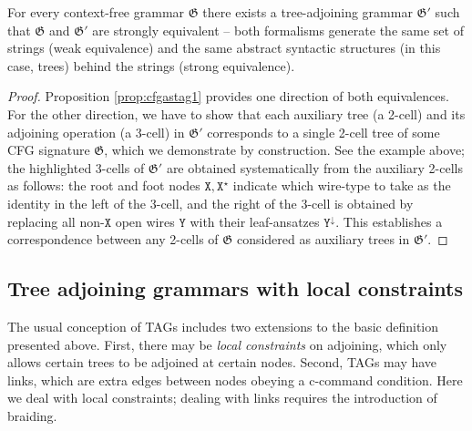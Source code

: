 \begin{corollary}
For every context-free grammar $\mathfrak{G}$ there exists a tree-adjoining grammar $\mathfrak{G}'$ such that $\mathfrak{G}$ and $\mathfrak{G}'$ are strongly equivalent -- both formalisms generate the same set of strings (weak equivalence) and the same abstract syntactic structures (in this case, trees) behind the strings (strong equivalence).
\begin{proof}
Proposition \ref{prop:cfgastag1} provides one direction of both equivalences. For the other direction, we have to show that each auxiliary tree (a 2-cell) and its adjoining operation (a 3-cell) in $\mathfrak{G}'$ corresponds to a single 2-cell tree of some CFG signature $\mathfrak{G}$, which we demonstrate by construction. See the example above; the highlighted 3-cells of $\mathfrak{G}'$ are obtained systematically from the auxiliary 2-cells as follows: the root and foot nodes $\texttt{X},\texttt{X}^\star$ indicate which wire-type to take as the identity in the left of the 3-cell, and the right of the 3-cell is obtained by replacing all non-$\texttt{X}$ open wires $\texttt{Y}$ with their leaf-ansatzes $\texttt{Y}^\downarrow$. This establishes a correspondence between any 2-cells of $\mathfrak{G}$ considered as auxiliary trees in $\mathfrak{G}'$.
\end{proof}
\end{corollary}

\subsection{Tree adjoining grammars with local constraints}

The usual conception of TAGs includes two extensions to the basic definition presented above. First, there may be \emph{local constraints} on adjoining, which only allows certain trees to be adjoined at certain nodes. Second, TAGs may have links, which are extra edges between nodes obeying a c-command condition. Here we deal with local constraints; dealing with links requires the introduction of braiding.



